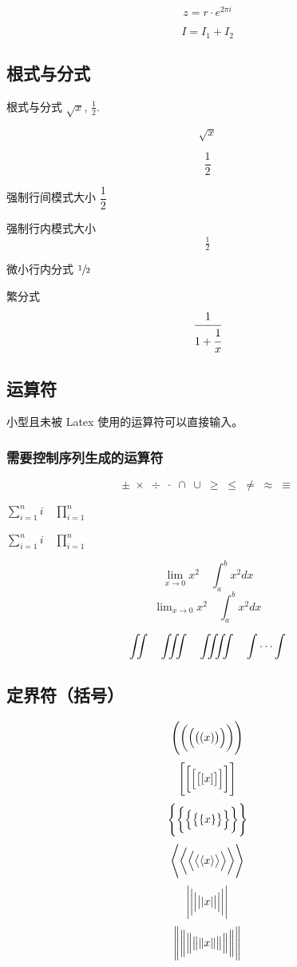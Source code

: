 \documentclass[UTF8]{ctexart}
\begin{document}
\[z = r\cdot e^{2\pi i}\]

\[I = I_1 + I_2\]

\subsection{根式与分式}

根式与分式 $\sqrt{x}$, $\frac12$.

\[ \sqrt{x} \]

\[ \frac{1}{2} \]


强制行间模式大小 $\dfrac12 $

强制行内模式大小
\[ \tfrac{1}{2} \]

微小行内分式 $\sfrac 1 2$

繁分式 \[\cfrac{1}{1+\cfrac1x}\]

\subsection{运算符}

小型且未被 Latex 使用的运算符可以直接输入。

\subsubsection{需要控制序列生成的运算符}

\[ \pm\; \times \; \div\; \cdot\; \cap\; \cup\;
    \geq\; \leq\; \neq\; \approx \; \equiv \]

$ \sum_{i=1}^n i\quad \prod_{i=1}^n $

$ \sum\limits _{i=1}^n i\quad \prod\limits _{i=1}^n $

\[ \lim_{x\to0}x^2 \quad \int_a^b x^2 dx \]
\[ \lim\nolimits _{x\to0}x^2\quad \int\nolimits_a^b x^2 dx \]

\[ \iint\quad \iiint\quad \iiiint\quad \idotsint \]

\subsection{定界符（括号）}

\[ \Biggl(\biggl(\Bigl(\bigl((x)\bigr)\Bigr)\biggr)\Biggr) \]
\[ \Biggl[\biggl[\Bigl[\bigl[[x]\bigr]\Bigr]\biggr]\Biggr] \]
\[ \Biggl \{\biggl \{\Bigl \{\bigl \{\{x\}\bigr \}\Bigr \}\biggr \}\Biggr\} \]
\[ \Biggl\langle\biggl\langle\Bigl\langle\bigl\langle\langle x
    \rangle\bigr\rangle\Bigr\rangle\biggr\rangle\Biggr\rangle \]
\[ \Biggl\lvert\biggl\lvert\Bigl\lvert\bigl\lvert\lvert x
    \rvert\bigr\rvert\Bigr\rvert\biggr\rvert\Biggr\rvert \]
\[ \Biggl\lVert\biggl\lVert\Bigl\lVert\bigl\lVert\lVert x
    \rVert\bigr\rVert\Bigr\rVert\biggr\rVert\Biggr\rVert \]
\end{document}
